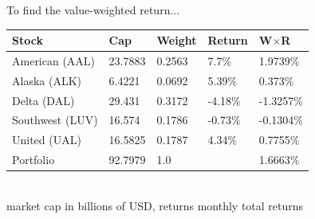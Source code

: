 To find the value-weighted return...
\begin{center}
	{\color{blue}
	\begin{tabular}{l|llll}
		\textbf{Stock} & \textbf{Cap} & \textbf{W}eight & \textbf{R}eturn & \textbf{W$\times$R}\\ \hline
		American (AAL) & 23.7883 & 0.2563 & 7.7\% & 1.9739\% \\
		Alaska (ALK) & 6.4221 & 0.0692 & 5.39\% & 0.373\% \\
		Delta (DAL) & 29.431 & 0.3172 & -4.18\% & -1.3257\% \\
		Southwest (LUV) & 16.574 & 0.1786 & -0.73\% & -0.1304\% \\
		United (UAL) & 16.5825 & 0.1787 & 4.34\% & 0.7755\% \\ \hline 
		Portfolio & 92.7979 & 1.0 & & 1.6663\%\\\hline
	\end{tabular}
	}\\
	{\footnotesize market cap in billions of USD, returns monthly total returns}
\end{center}